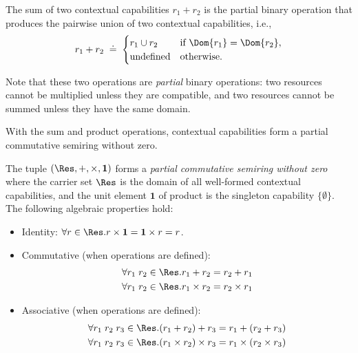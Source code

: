 \begin{definition}\label{def:contextual-capabilities-sum}
  The sum of two contextual capabilities $r_1 + r_2$ is the partial binary operation that produces the pairwise union of two contextual capabilities, i.e.,
  \[
    r_1 + r_2 \;\doteq\;
    \begin{cases}
      r_1 \cup r_2
        & \text{if } \Dom{r_1} = \Dom{r_2}, \\
        \text{undefined}
        & \text{otherwise.}
      \end{cases}
  \]
\end{definition}

Note that these two operations are \emph{partial} binary operations: two resources cannot be multiplied unless they are compatible, and two resources cannot be summed unless they have the same domain.

With the sum and product operations, contextual capabilities form a partial commutative semiring without zero.

\begin{definition}\label{def:contextual-capabilities-algebra}
  The tuple $(\Res,{+},{\times},\mathbf{1})$ forms a \emph{partial commutative semiring without zero} where the carrier set $\Res$ is the domain of all well-formed contextual capabilities, and the unit element $\mathbf{1}$ of product is the singleton capability $\{\emptyset\}$. The following algebraic properties hold:
  \begin{itemize}
  \item Identity: $\forall r \in \Res. r \times \mathbf{1} = \mathbf{1} \times r = r$.
  \item Commutative (when operations are defined): 
  \begin{align*}
    \forall r_1\;r_2 \in \Res. r_1 + r_2 = r_2 + r_1 \\
    \forall r_1\;r_2 \in \Res. r_1 \times r_2 = r_2 \times r_1
  \end{align*}
  \item Associative (when operations are defined): 
  \begin{align*}
    \forall r_1\;r_2\;r_3 \in \Res. (r_1 + r_2) + r_3 = r_1 + (r_2 + r_3) \\
    \forall r_1\;r_2\;r_3 \in \Res. (r_1 \times r_2) \times r_3 = r_1 \times (r_2 \times r_3)
  \end{align*}
  \end{itemize}
\end{definition}


